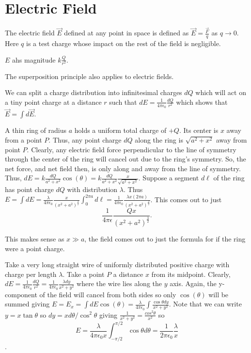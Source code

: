 \section{Electric Field}

\begin{definition}
    The electric field $\vec{E}$ defined at any point in space is defined as $\vec{E} = \frac{\vec{F}}{q}$ as $q \to 0$. Here $q$ is a test charge whose impact on the rest of the field is negligible.

    $E$ ahs magnitude $k\frac{Q}{r^2}$.
\end{definition}
\begin{note}
    The superposition principle also applies to electric fields.
\end{note}
\begin{remark}
    We can split a charge distribution into infinitesimal charges $dQ$ which will act on a tiny point charge at a distance $r$ such that $dE = \frac{1}{4\pi\epsilon_0}\frac{dQ}{r^2}$ which shows that $\vec{E} = \int d\vec{E}.$
\end{remark}
\begin{example}
    A thin ring of radius $a$ holds a uniform total charge of $+Q$. Its center is $x$ away from a point $P$. Thus, any point charge $dQ$ along the ring is $\sqrt{a^2+x^2}$ away from point $P$. Clearly, any electric field force perpendicular to the line of symmetry through the center of the ring will cancel out due to the ring's symmetry. So, the net force, and net field then, is only along and away from the line of symmetry. Thus, $dE = k\frac{dQ}{a^2+x^2} \cos(\theta) = k\frac{dQ}{a^2+x^2}\frac{x}{\sqrt{a^2+x^2}}$. Suppose a segment $d\ell$ of the ring has point charge $dQ$ with distribution $\lambda$. Thus $E = \int dE = \frac{\lambda}{4\pi\epsilon_0}\frac{x}{(x^2+a^2)^\frac{3}{2}}\int_0^{2\pi a} d\ell = \frac{1}{4\pi\epsilon_0}\frac{\lambda x(2\pi a)}{(x^2+a^2)^{\frac{3}{2}}}$. This comes out to just $$\frac{1}{4\pi\epsilon}\frac{Qx}{(x^2+a^2)^\frac{3}{2}}.$$

    This makes sense as $x \gg a$, the field comes out to just the formula for if the ring were a point charge.
\end{example}
\begin{example}
    Take a very long straight wire of uniformly distributed positive charge with charge per length $\lambda$. Take a point $P$ a distance $x$ from its midpoint. Clearly, $dE = \frac{1}{4\pi\epsilon_0}\frac{dQ}{r^2}  = \frac{1}{4\pi\epsilon_0}\frac{\lambda dy}{x^2+y^2}$ where the wire lies along the $y$ axis. Again, the y-component of the field will cancel from both sides so only $\cos(\theta)$ will be summed giving $E = E_x = \int dE \cos(\theta) = \frac{\lambda}{4\pi\epsilon_0} \int \frac{\cos\theta dy}{x^2+y^2}$. Note that we can write $y = x \tan\theta$ so $dy = xd\theta/\cos^2\theta$ giving $\frac{1}{x^2+y^2}=\frac{cos^2\theta}{x^2}$ so $$E = \frac{\lambda}{4\pi\epsilon_0x}\int_{-\pi/2}^{\pi/2}\cos\theta d\theta = \frac{1}{2\pi\epsilon_0}\frac{\lambda}{x}$$.
\end{example}

